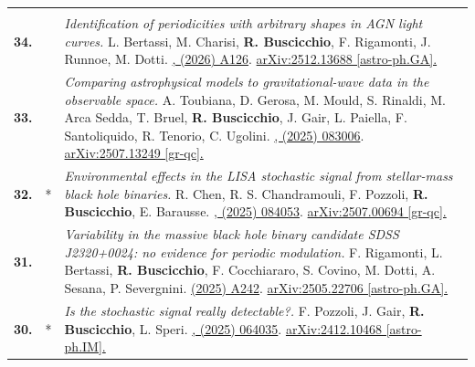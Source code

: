 {\begin{longtable}{rp{0.3cm}p{15.8cm}}
\vspace{0.09cm}\\
%
\textbf{34.} & & \textit{Identification of periodicities with arbitrary shapes in AGN light curves.}
\newline{}
L. Bertassi, M. Charisi, \textbf{R. Buscicchio}, F. Rigamonti, J. Runnoe, M. Dotti.
\newline{}
\href{https://doi.org/10.1051/0004-6361/202558583}{\aap  711, (2026) A126}. \href{https://arxiv.org/abs/2512.13688}{arXiv:2512.13688 [astro-ph.GA].}
\vspace{0.09cm}\\
%
\textbf{33.} & & \textit{Comparing astrophysical models to gravitational-wave data in the observable space.}
\newline{}
A. Toubiana, D. Gerosa, M. Mould, S. Rinaldi, M. Arca Sedda, T. Bruel, \textbf{R. Buscicchio}, J. Gair, L. Paiella, F. Santoliquido, R. Tenorio, C. Ugolini.
\newline{}
\href{https://doi.org/10.1103/8xkp-zpj1}{\prd 113, (2025) 083006}. \href{https://arxiv.org/abs/2507.13249}{arXiv:2507.13249 [gr-qc].}
\vspace{0.09cm}\\
%
\textbf{32.} & * & \textit{Environmental effects in the LISA stochastic signal from stellar-mass black hole binaries.}
\newline{}
R. Chen, R. S. Chandramouli, F. Pozzoli, \textbf{R. Buscicchio}, E. Barausse.
\newline{}
\href{https://doi.org/10.1103/w61d-3jk5}{\prd 112, (2025) 084053}. \href{https://arxiv.org/abs/2507.00694}{arXiv:2507.00694 [gr-qc].}
\vspace{0.09cm}\\
%
\textbf{31.} & & \textit{Variability in the massive black hole binary candidate SDSS J2320+0024: no evidence for periodic modulation.}
\newline{}
F. Rigamonti, L. Bertassi, \textbf{R. Buscicchio}, F. Cocchiararo, S. Covino, M. Dotti, A. Sesana, P. Severgnini.
\newline{}
\href{https://doi.org/10.1051/0004-6361/202555550}{\aap 702 (2025) A242}. \href{https://arxiv.org/abs/2505.22706}{arXiv:2505.22706 [astro-ph.GA].}
\vspace{0.09cm}\\
%
\textbf{30.} & * & \textit{Is the stochastic signal really detectable?.}
\newline{}
F. Pozzoli, J. Gair, \textbf{R. Buscicchio}, L. Speri.
\newline{}
\href{https://doi.org/10.1103/22h4-tqh9}{\prd 112, (2025) 064035}. \href{https://arxiv.org/abs/2412.10468}{arXiv:2412.10468 [astro-ph.IM].}

\end{longtable}}
